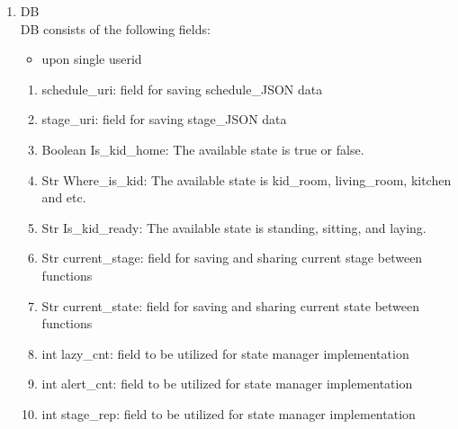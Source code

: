 \documentclass[conference]{IEEEtran}
\begin{document}
\begin{enumerate}[label=\arabic*.]
\begin{enumerate}[label=\arabic*.]
\begin{enumerate}[label=\alph*.]
\begin{enumerate}[label=\roman*.]
        \end{enumerate}
    \end{enumerate}      
    \item {\large{DB}} \\
    DB consists of the following fields: \\
    \begin{itemize}
        \item {\large{upon single userid}} 
    \end{itemize}
    \begin{enumerate}[label=\alph*.]
        \item {\large{schedule\_uri: field for saving schedule\_JSON data}} 
        \item {\large{stage\_uri: field for saving stage\_JSON data}} 
        \item {\large{Boolean Is\_kid\_home: The available state is true or false.}} 
        \item {\large{Str Where\_is\_kid: The available state is kid\_room, living\_room, kitchen and etc. }} 
        \item {\large{Str Is\_kid\_ready: The available state is standing, sitting, and laying. }}
        \item {\large{Str current\_stage: field for saving and sharing current stage between functions}}
        \item {\large{Str current\_state: field for saving and sharing current state between functions}}
        \item {\large{int lazy\_cnt: field to be utilized for state manager implementation}}
        \item {\large{int alert\_cnt: field to be utilized for state manager implementation}}
        \item {\large{int stage\_rep: field to be utilized for state manager implementation}} \\   
    \end{enumerate}
\end{enumerate}
\newpage


\end{enumerate}
\end{document}
